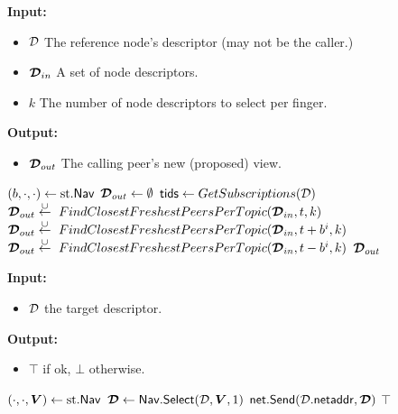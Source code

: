 \begin{algorithm}[H]
\caption{\navselect. Navigation selection algorithm, approximating the caller's outgoing links in the target structure}
\label{alg:navselect}
\textbf{Input:}
\begin{itemize}
\vspace{-.8em}
\itemsep0em 
    \item $\mathcal{D}$ The reference node's descriptor (may not be the caller.)
    \item $\boldsymbol{\mathcal{D}}_{in}$ A set of node descriptors.
    \item $k$ The number of node descriptors to select per finger.
\end{itemize}
\textbf{Output:}
\begin{itemize}
\vspace{-.8em}
\itemsep0em 
    \item $\boldsymbol{\mathcal{D}}_{out}$ The calling peer's new (proposed) view.
\end{itemize}
\begin{algorithmic}
    \State $(b,\cdot,\cdot) \gets \text{st}.\mathsf{Nav}$
    \State $\boldsymbol{\mathcal{D}}_{out} \gets \emptyset$
    \State {}
    \State $\mathsf{tids} \gets GetSubscriptions(\mathcal{D})$
    \State {}
    \State $\boldsymbol{\mathcal{D}}_{out} \stackrel{\cup}{\gets}~FindClosestFreshestPeersPerTopic(\boldsymbol{\mathcal{D}}_{in},t,k)$
    \State {}
    \State $\boldsymbol{\mathcal{D}}_{out} \stackrel{\cup}{\gets}~FindClosestFreshestPeersPerTopic(\boldsymbol{\mathcal{D}}_{in},t+b^i,k)$
    \State $\boldsymbol{\mathcal{D}}_{out} \stackrel{\cup}{\gets}~FindClosestFreshestPeersPerTopic(\boldsymbol{\mathcal{D}}_{in},t-b^i,k)$
    \EndFor
    \EndFor
    \State \Return $\boldsymbol{\mathcal{D}}_{out}$ 
\end{algorithmic}
\end{algorithm}

\begin{algorithm}[H]
\caption{\navsend}
\label{alg:navsend}
\textbf{Input:}
\begin{itemize}
\vspace{-.8em}
\itemsep0em 
    \item $\mathcal{D}$ the target descriptor.
\end{itemize}
\textbf{Output:}
\begin{itemize}
\vspace{-.8em}
\itemsep0em 
    \item $\top$ if ok, $\bot$ otherwise.
\end{itemize}
\begin{algorithmic}
    \State $(\cdot,\cdot,\boldsymbol{V}) \gets \text{st}.\mathsf{Nav}$
    \State $\boldsymbol{\mathcal{D}} \gets \mathsf{Nav}.\mathsf{Select}(\mathcal{D},\boldsymbol{V},1)$ 
    \State $\mathsf{net}.\mathsf{Send}(\mathcal{D}.\mathsf{netaddr},\boldsymbol{\mathcal{D}})$
    \State \Return $\top$
\end{algorithmic}
\end{algorithm}

